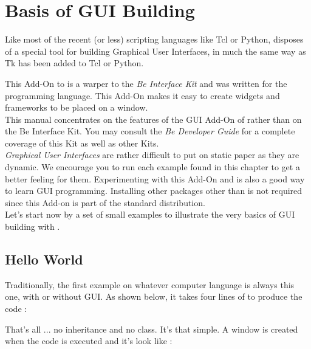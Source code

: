 \chapter{Basis of GUI Building}

Like most of the recent (or less) scripting languages like Tcl or Python, \squirrel disposes of a special tool for building Graphical User Interfaces, in much the same way as Tk has been added to Tcl or Python.

This Add-On to \squirrel is a warper to the {\em Be Interface Kit} and was written for the \squirrel programming language. This Add-On makes it easy to create widgets and frameworks to be placed on a window.\\

This manual concentrates on the features of the GUI Add-On of \squirrel rather than on the Be Interface Kit.  You may consult the {\em Be Developer Guide} for a complete coverage of this Kit as well as other Kits.\\

{\em Graphical User Interfaces} are rather difficult to put on static paper as they are dynamic. We encourage you to run each example found in this chapter to get a better feeling for them.  Experimenting with this Add-On and \squirrel is also a good way to learn GUI programming. Installing other packages other than \squirrel is not required since this Add-on is part of the standard \squirrel distribution.\\

Let's start now by a set of small examples to illustrate the very basics of GUI building with \squirrel.\\

\section{Hello World}

Traditionally, the first example on whatever computer language is always this one, with or without GUI. As shown below, it takes four lines of \squirrel to produce the code :
	

That's all ... no inheritance and no class.  It's that simple. A window is created when the code is executed and it's look like :

